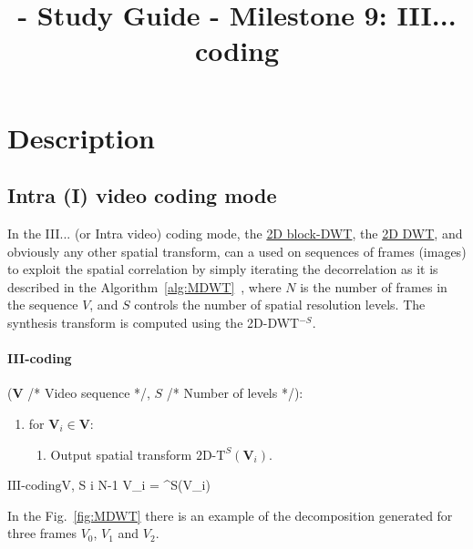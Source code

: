 
\title{\SM{} - Study Guide - Milestone 9: III... coding}

\maketitle

\tableofcontents

\section{Description}

\subsection{Intra (I) video coding mode}

In the III... (or Intra video) coding mode, the
\href{https://sistemas-multimedia.github.io/milestones/07-DCT/}{2D
  block-DWT}, the
\href{https://sistemas-multimedia.github.io/milestones/08-DWT/}{2D
  DWT}, and obviously any other spatial transform, can a used on
sequences of frames (images) to exploit the spatial correlation by
simply iterating the decorrelation as it is described in the
Algorithm~\ref{alg:MDWT}~\cite{taubman2002jpeg2000}, where $N$ is the
number of frames in the sequence $V$, and $S$ controls the number of
spatial resolution levels. The synthesis transform is computed using
the 2D-DWT$^{-S}$.

\paragraph*{III-coding}($\mathbf{V}$ /* Video sequence */, $S$ /* Number of levels */):
\label{alg:III_coding}
\begin{enumerate}
\item for ${\mathbf V}_i\in {\mathbf V}$:
  \begin{enumerate}
  \item Output spatial transform $\text{2D-T}^{S}({\mathbf V}_i)$.
  \end{enumerate}
\end{enumerate}

\begin{pseudocode}{$\text{III-coding}$}{V, S}
  \label{alg:MDWT}
  \FOR i  \TO N-1 \DO
  V_i = ^S(V_i)
\end{pseudocode}

In the Fig.~\ref{fig:MDWT} there is an example of the decomposition
generated for three frames $V_0$, $V_1$ and $V_2$.

